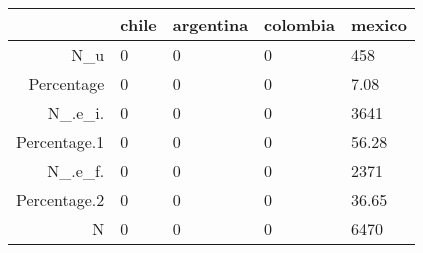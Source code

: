 \begin{table}[ht]
\centering
\begin{tabular}{rllll}
  \hline
 & chile & argentina & colombia & mexico \\ 
  \hline
N\_u & 0 & 0 & 0 & 458 \\ 
  Percentage & 0 & 0 & 0 & 7.08 \\ 
  N\_.e\_i. & 0 & 0 & 0 & 3641 \\ 
  Percentage.1 & 0 & 0 & 0 & 56.28 \\ 
  N\_.e\_f. & 0 & 0 & 0 & 2371 \\ 
  Percentage.2 & 0 & 0 & 0 & 36.65 \\ 
  N & 0 & 0 & 0 & 6470 \\ 
   \hline
\end{tabular}
\end{table}
